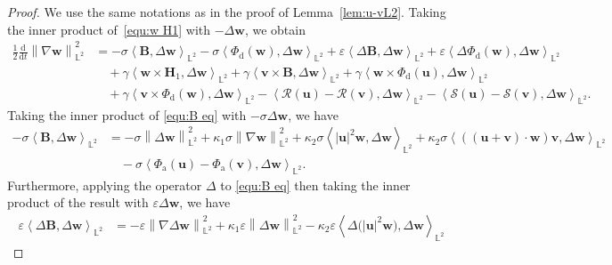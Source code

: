 \documentclass[11pt, reqno]{amsart}
\theoremstyle{definition}
\numberwithin{equation}{section}
\newcommand{\bff}{\boldsymbol}
\newcommand{\bb}{\mathbb}
\newcommand{\ddt}{\frac{\mathrm{d}}{\mathrm{d}t}}
\newcommand{\norm}[2]{\left\|{#1}\right\|_{#2}}
\newcommand{\inpro}[2]{\left\langle#1,#2\right\rangle}
\begin{document}
\begin{proof}
We use the same notations as in the proof of Lemma~\ref{lem:u-vL2}. Taking the inner product of~\eqref{equ:w H1} with $-\Delta \bff{w}$, we obtain
\begin{align}\label{equ:12 nab w L2}
    \frac12 \ddt \norm{\nabla \bff{w}}{\bb{L}^2}^2
    &=
    -
    \sigma \inpro{\bff{B}}{\Delta \bff{w}}_{\bb{L}^2}
    -
    \sigma \inpro{\Phi_{\mathrm{d}} (\bff{w})}{\Delta \bff{w}}_{\bb{L}^2}
    +
    \varepsilon \inpro{\Delta \bff{B}}{\Delta\bff{w}}_{\bb{L}^2}
    +
    \varepsilon \inpro{\Delta \Phi_{\mathrm{d}}(\bff{w})}{\Delta \bff{w}}_{\bb{L}^2}
    \nonumber \\
    &\quad
    +
    \gamma \inpro{\bff{w}\times \bff{H}_1}{\Delta \bff{w}}_{\bb{L}^2}
    +
    \gamma \inpro{\bff{v}\times \bff{B}}{\Delta \bff{w}}_{\bb{L}^2}
    +
    \gamma \inpro{\bff{w}\times \Phi_{\mathrm{d}}(\bff{u})}{\Delta \bff{w}}_{\bb{L}^2}
    \nonumber \\
    &\quad
    +
    \gamma \inpro{\bff{v} \times \Phi_{\mathrm{d}}(\bff{w})}{\Delta \bff{w}}_{\bb{L}^2}
    -
    \inpro{\mathcal{R}(\bff{u})-\mathcal{R}(\bff{v})}{\Delta \bff{w}}_{\bb{L}^2}
    -
    \inpro{\mathcal{S}(\bff{u})-\mathcal{S}(\bff{v})}{\Delta \bff{w}}_{\bb{L}^2}.
\end{align}
Taking the inner product of \eqref{equ:B eq} with $-\sigma\Delta \bff{w}$, we have
\begin{align}\label{equ:sigma B Delta w}
    -\sigma\inpro{\bff{B}}{\Delta \bff{w}}_{\bb{L}^2}
    &=
    -\sigma \norm{\Delta \bff{w}}{\bb{L}^2}^2
    +
    \kappa_1 \sigma \norm{\nabla \bff{w}}{\bb{L}^2}^2
    +
    \kappa_2 \sigma \inpro{|\bff{u}|^2 \bff{w}}{\Delta \bff{w}}_{\bb{L}^2}
    +
    \kappa_2 \sigma \inpro{((\bff{u}+\bff{v})\cdot \bff{w})\bff{v}}{\Delta \bff{w}}_{\bb{L}^2}
    \nonumber \\
    &\quad
    -
    \sigma \inpro{\Phi_{\mathrm{a}}(\bff{u})-\Phi_{\mathrm{a}}(\bff{v})}{\Delta \bff{w}}_{\bb{L}^2}.
\end{align}
Furthermore, applying the operator $\Delta$ to \eqref{equ:B eq} then taking the inner product of the result with $\varepsilon\Delta \bff{w}$, we have
\begin{align}\label{equ:ep Delta B Delta w}
    \varepsilon\inpro{\Delta \bff{B}}{\Delta \bff{w}}_{\bb{L}^2}
    &=
    -
    \varepsilon \norm{\nabla\Delta \bff{w}}{\bb{L}^2}^2
    +
    \kappa_1 \varepsilon \norm{\Delta \bff{w}}{\bb{L}^2}^2
    -
    \kappa_2 \varepsilon \inpro{\Delta \big(|\bff{u}|^2 \bff{w}\big)}{\Delta \bff{w}}_{\bb{L}^2}

\end{align}
\end{proof}
\end{document}
